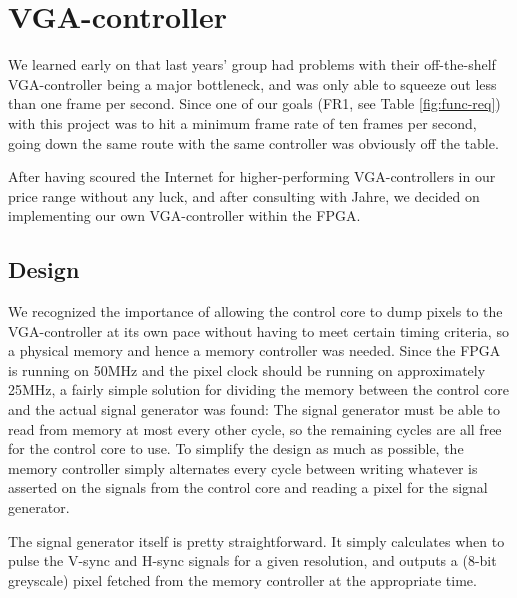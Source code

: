 \section{VGA-controller}

We learned early on that last years' group had problems with their off-the-shelf
\ac{VGA}-controller being a major bottleneck, and was only able to squeeze out less
than one frame per second. Since one of our goals ({\sc FR1}, see Table
\ref{fig:func-req}) with this project was to hit a minimum frame rate of ten
frames per second, going down the same route with the same controller was
obviously off the table.

After having scoured the Internet for higher-performing \ac{VGA}-controllers in our
price range without any luck, and after consulting with Jahre, we decided on
implementing our own \ac{VGA}-controller within the \ac{FPGA}.



\subsection{Design}
We recognized the importance of allowing the control core to dump pixels to the
\ac{VGA}-controller at its own pace without having to meet certain timing criteria,
so a physical memory and hence a memory controller was needed. Since the \ac{FPGA}
is running on 50MHz and the pixel clock should be running on approximately
25MHz, a fairly simple solution for dividing the memory between the control
core and the actual signal generator was found: The signal generator must be
able to read from memory at most every other cycle, so the remaining cycles are
all free for the control core to use. To simplify the design as much as
possible, the memory controller simply alternates every cycle between writing
whatever is asserted on the signals from the control core and reading a pixel
for the signal generator.

The signal generator itself is pretty straightforward. It simply calculates
when to pulse the V-sync and H-sync signals for a given resolution, and outputs
a (8-bit greyscale) pixel fetched from the memory controller at the appropriate
time.

